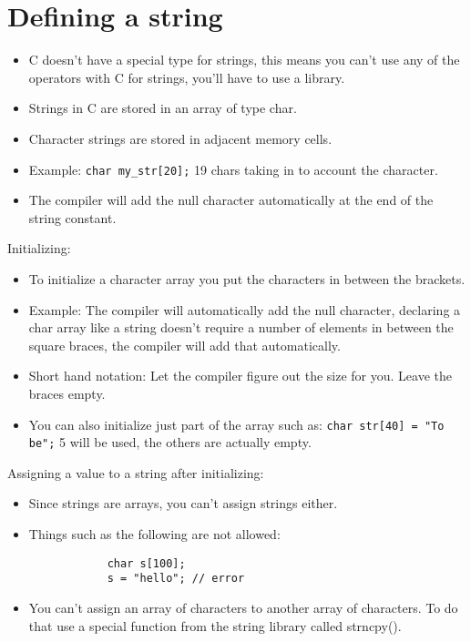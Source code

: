 \section{Defining a string}
\begin{itemize}
    \item C doesn't have a special type for strings, this means you can't use any of the operators with C for strings, you'll have to use a library.  
    \item Strings in C are stored in an array of type char. 
    \item Character strings are stored in adjacent memory cells. 
    \item Example: \texttt{char my_str[20];} 19 chars taking in to account the \texttt{\0} character. 
    \item The compiler will add the null character automatically at the end of the string constant. 
\end{itemize}
Initializing: 
\begin{itemize}
    \item To initialize a character array you put the characters in between the brackets. 
    \item Example: 
    The compiler will automatically add the null character, declaring a char array like a string doesn't require a number of elements in between the square braces, the compiler will add that automatically. 
    
    \item Short hand notation: 
    Let the compiler figure out the size for you. Leave the braces empty. 
    
    \item You can also initialize just part of the array such as: \texttt{char str[40] = "To be";} 5 will be used, the others are actually empty. 
\end{itemize}
Assigning a value to a string after initializing: 
\begin{itemize}
    \item Since strings are arrays, you can't assign strings either. 
    \item Things such as the following are not allowed: 
        \begin{verbatim}
            char s[100]; 
            s = "hello"; // error 
        \end{verbatim}
    
    \item You can't assign an array of characters to another array of characters. To do that use a special function from the string library called strncpy().
\end{itemize}
